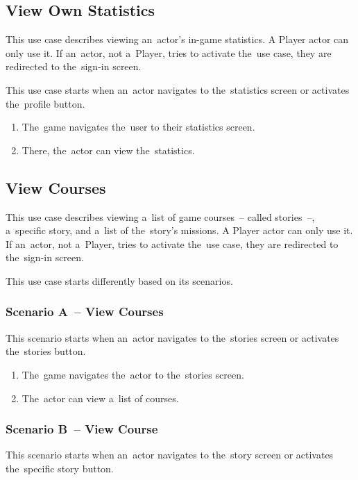 \subsection{View Own Statistics}

This use case describes viewing an~actor's in-game statistics.
A Player actor can only use it.
If an~actor, not a~Player, tries to activate the~use case, they are redirected to the~sign-in screen.

This use case starts when an~actor navigates to the~statistics screen or activates the~profile button.

\begin{enumerate}
    \item The~game navigates the~user to their statistics screen.
    \item There, the~actor can view the~statistics.
\end{enumerate}

\pagebreak
\subsection{View Courses}

This use case describes viewing a~list of game courses~-- called stories~--, a~specific story, and a~list of the~story's missions.
A Player actor can only use it.
If an~actor, not a~Player, tries to activate the~use case, they are redirected to the~sign-in screen.

This use case starts differently based on its scenarios.

\subsubsection*{Scenario A~-- View Courses}

This scenario starts when an~actor navigates to the~stories screen or activates the~stories button.

\begin{enumerate}
    \item The~game navigates the~actor to the~stories screen.
    \item The~actor can view a~list of courses.
\end{enumerate}

\subsubsection*{Scenario B~-- View Course}

This scenario starts when an~actor navigates to the~story screen or activates the~specific story button.

